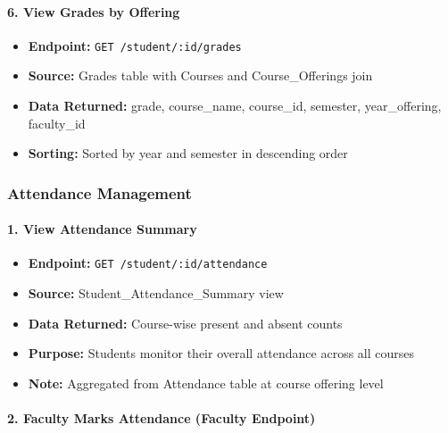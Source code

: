 \documentclass[12pt]{article}
\begin{document}
\paragraph{6. View Grades by Offering}
\begin{itemize}
    \item \textbf{Endpoint:} \texttt{GET /student/:id/grades}
    \item \textbf{Source:} Grades table with Courses and Course\_Offerings join
    \item \textbf{Data Returned:} grade, course\_name, course\_id, semester, year\_offering, faculty\_id
    \item \textbf{Sorting:} Sorted by year and semester in descending order
\end{itemize}

\subsubsection{Attendance Management}

\paragraph{1. View Attendance Summary}
\begin{itemize}
    \item \textbf{Endpoint:} \texttt{GET /student/:id/attendance}
    \item \textbf{Source:} Student\_Attendance\_Summary view
    \item \textbf{Data Returned:} Course-wise present and absent counts
    \item \textbf{Purpose:} Students monitor their overall attendance across all courses
    \item \textbf{Note:} Aggregated from Attendance table at course offering level
\end{itemize}

\paragraph{2. Faculty Marks Attendance (Faculty Endpoint)}
\end{document}
